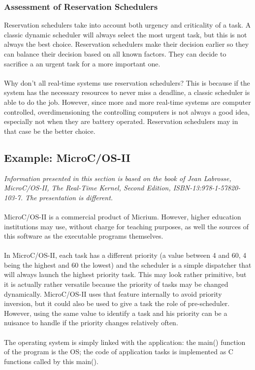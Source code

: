 \documentclass[../main.tex]{subfiles}
\begin{document}
\subsubsection{Assessment of Reservation Schedulers}
Reservation schedulers take into account both urgency and criticality of a task. A classic dynamic scheduler will always select the most urgent task, but this is not always the best choice. Reservation schedulers make their decision earlier so they can balance their decision based on all known factors. They can decide to sacrifice a an urgent task for a more important one.
\\\\
Why don't all real-time systems use reservation schedulers? This is because if the system has the necessary resources to never miss a deadline, a classic scheduler is able to do the job. However, since more and more real-time systems are computer controlled, overdimensioning the controlling computers is not always a good idea, especially not when they are battery operated. Reservation schedulers may in that case be the better choice.

\subsection{Example: MicroC/OS-II}
\textit{Information presented in this section is based on the book of Jean Labrosse, MicroC/OS-II, The Real-Time Kernel, Second Edition, ISBN-13:978-1-57820-103-7. The presentation is different.}
\\\\
MicroC/OS-II is a commercial product of Micrium. However, higher education institutions may use, without charge for teaching purposes, as well the sources of this software as the executable programs themselves.
\\\\
In MicroC/OS-II, each task has a different priority (a value between 4 and 60, 4 being the highest and 60 the lowest) and the scheduler is a simple dispatcher that will always launch the highest priority task. This may look rather primitive, but it is actually rather versatile because the priority of tasks may be changed dynamically. MicroC/OS-II uses that feature internally to avoid priority inversion, but it could also be used to give a task the role of pre-scheduler. However, using the same value to identify a task and his priority can be a nuisance to handle if the priority changes relatively often.
\\\\
The operating system is simply linked with the application: the main() function of the program is the OS; the code of application tasks is implemented as C functions called by this main().
\end{document}
